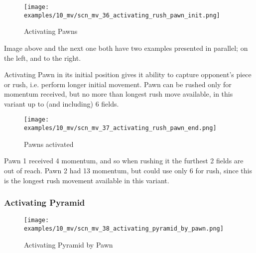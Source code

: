 \vspace*{-1.4\baselineskip}
\noindent
\begin{figure}[!h]
\texttt{[image: examples/10\_mv/scn\_mv\_36\_activating\_rush\_pawn\_init.png]}
\vspace*{-1.3\baselineskip}
\caption{Activating Pawns}
\label{fig:scn_mv_36_activating_rush_pawn_init}
\end{figure}

\vspace*{-0.3\baselineskip}
Image above and the next one both have two examples presented in parallel; on the left,
and to the right.

Activating Pawn in its initial position gives it ability to capture opponent's
piece or rush, i.e. perform longer initial movement. Pawn can be rushed only for
momentum received, but no more than longest rush move available, in this variant
up to (and including) 6 fields.

\clearpage %

\vspace*{-2.1\baselineskip}
\noindent
\begin{figure}[!h]
\texttt{[image: examples/10\_mv/scn\_mv\_37\_activating\_rush\_pawn\_end.png]}
\caption{Pawns activated}
\label{fig:scn_mv_37_activating_rush_pawn_end}
\end{figure}

Pawn 1 received 4 momentum, and so when rushing it the furthest 2 fields are out
of reach. Pawn 2 had 13 momentum, but could use only 6 for rush, since this is the
longest rush movement available in this variant.

\clearpage %

\subsubsection*{Activating Pyramid}
\label{sec:Miranda's veil/Wave/Cascading Waves/Activating Pyramid}

\vspace*{-1.4\baselineskip}
\noindent
\begin{figure}[!h]
\texttt{[image: examples/10\_mv/scn\_mv\_38\_activating\_pyramid\_by\_pawn.png]}
\vspace*{-1.3\baselineskip}
\caption{Activating Pyramid by Pawn}
\label{fig:scn_mv_38_activating_pyramid_by_pawn}
\end{figure}

